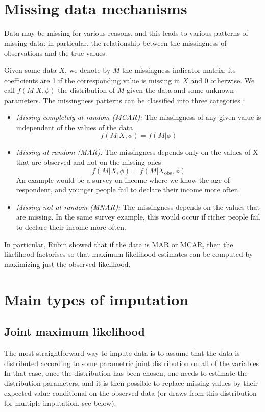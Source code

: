 	\section{Missing data mechanisms}
	Data may be missing for various reasons, and this leads to various patterns of missing data: in particular, the relationship between the missingness of observations and the true values. 
	
	Given some data $X$, we denote by $M$ the missingness indicator matrix: its coefficients are 1 if the corresponding value is missing in $X$ and 0 otherwise. We call $f(M \vert X, \phi)$ the distribution of $M$ given the data and some unknown parameters. The missingness patterns can be classified into three categories \cite[Ch.\ 1]{Rubin_missdata}:
	
\begin{itemize}
	\item \emph{Missing completely at random (MCAR):} The missingness of any given value is independent of the values of the data
	$$ f(M \vert X, \phi) = f(M \vert \phi)$$
	\item \emph{Missing at random (MAR):} The missingness depends only on the values of X that are observed and not on the missing ones
	$$f(M \vert X, \phi) = f(M \vert X_{\text{obs}}, \phi)$$
	An example would be a survey on income where we know the age of respondent, and younger people fail to declare their income more often.
	\item \emph{Missing not at random (MNAR):} The missingness depends on the values that are missing. In the same survey example, this would occur if richer people fail to declare their income more often.
\end{itemize}

In particular, Rubin showed \cite{rubin1976ignorable} that if the data is MAR or MCAR, then the likelihood factorises so that maximum-likelihood estimates can be computed by maximizing just the observed likelihood.

	\section{Main types of imputation}
		\subsection{Joint maximum likelihood}
The most straightforward way to impute data is to assume that the data is distributed according to some parametric joint distribution on all of the variables. In that case, once the distribution has been chosen, one needs to estimate the distribution parameters, and it is then possible to replace missing values by their expected value conditional on the observed data (or draws from this distribution for multiple imputation, see below).\cite{kropko2014joint} \cite{ref_amelia} \cite{pkg_norm} 

